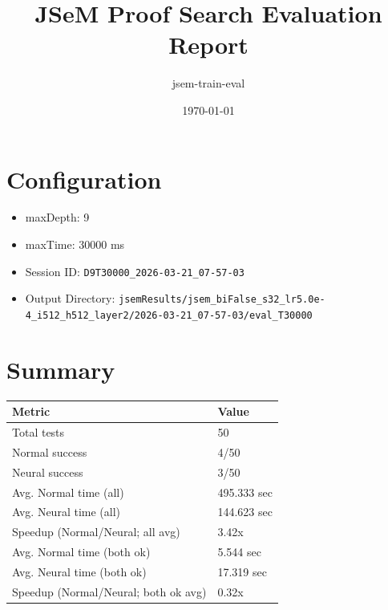 \documentclass[a4paper,10pt]{article}
\title{JSeM Proof Search Evaluation Report}
\author{jsem-train-eval}
\date{\today}
\begin{document}
\maketitle

\section{Configuration}
\begin{itemize}
\item maxDepth: 9
\item maxTime: 30000 ms
\item Session ID: \texttt{D9T30000\_2026-03-21\_07-57-03}
\item Output Directory: \texttt{jsemResults/jsem\_biFalse\_s32\_lr5.0e-4\_i512\_h512\_layer2/2026-03-21\_07-57-03/eval\_T30000}
\end{itemize}

\section{Summary}
\begin{tabular}{ll}
\toprule
\textbf{Metric} & \textbf{Value} \\
\midrule
Total tests & 50 \\
Normal success & 4/50 \\
Neural success & 3/50 \\
\midrule
Avg. Normal time (all) & 495.333 sec \\
Avg. Neural time (all) & 144.623 sec \\
Speedup (Normal/Neural; all avg) & 3.42x \\
Avg. Normal time (both ok) & 5.544 sec \\
Avg. Neural time (both ok) & 17.319 sec \\
Speedup (Normal/Neural; both ok avg) & 0.32x \\
\bottomrule
\end{tabular}
\end{document}
